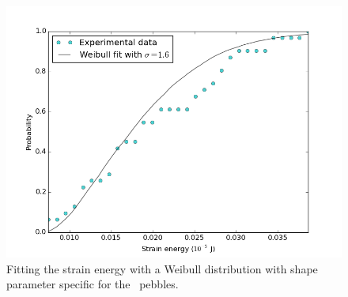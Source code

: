 \begin{figure}[!t]
\centering
    \includegraphics[width=\doubleimagewidth]{chapters/figures/fzk-w-cdf-fit.png}
    \caption{Fitting the strain energy with a Weibull distribution with shape parameter specific for the \lis~pebbles.}
    \label{fig:fzk-w-cdf}
\end{figure}

